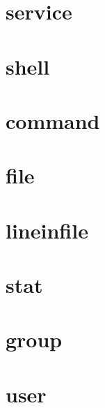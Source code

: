 \section{service}

\section{shell}

\section{command}

\section{file}

\section{lineinfile}

\section{stat}

\section{group}

\section{user}
